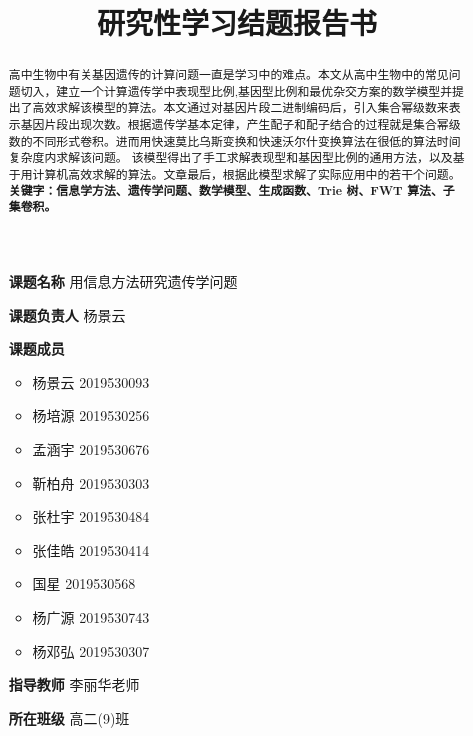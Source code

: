 \documentclass[12pt]{article} %
\title{研究性学习结题报告书}
\author{}
\begin{document}
	
\maketitle

\begin{itemize}
	\item[\textbf{课题名称}] 用信息方法研究遗传学问题 \centering
	\item[\textbf{课题负责人}] 杨景云
	\item[\textbf{课题成员}]{ 
		\begin{itemize} 
			\item 杨景云 2019530093 \centering
			\item 杨培源 2019530256
			\item 孟涵宇 2019530676
			\item 靳柏舟 2019530303
			\item 张杜宇 2019530484
			\item 张佳皓 2019530414
			\item 国星 2019530568
			\item 杨广源 2019530743
			\item 杨邓弘 2019530307
		\end{itemize}
	}\centering
	\item[\textbf{指导教师}] 李丽华老师
	\item[\textbf{所在班级}] 高二(9)班
\end{itemize}


\newpage 

\begin{abstract}
\fontsize{12.0pt}{\baselineskip}\selectfont %
高中生物中有关基因遗传的计算问题一直是学习中的难点。本文从高中生物中的常见问题切入，建立一个计算遗传学中表现型比例,基因型比例和最优杂交方案的数学模型并提出了高效求解该模型的算法。本文通过对基因片段二进制编码后，引入集合幂级数来表示基因片段出现次数。根据遗传学基本定律，产生配子和配子结合的过程就是集合幂级数的不同形式卷积。进而用快速莫比乌斯变换和快速沃尔什变换算法在很低的算法时间复杂度内求解该问题。
该模型得出了手工求解表现型和基因型比例的通用方法，以及基于用计算机高效求解的算法。文章最后，根据此模型求解了实际应用中的若干个问题。
\newline %
\newline
\textbf{关键字：信息学方法、遗传学问题、数学模型、生成函数、Trie 树、FWT 算法、子集卷积。}
\newline %
\end{abstract}
\end{document}

